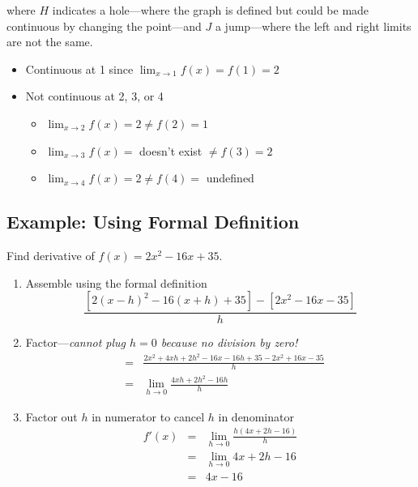 where $H$ indicates a hole---where the graph is defined but could be made continuous by changing the point---and $J$ a jump---where the left and right limits are not the same.

\begin{itemize}
    \item Continuous at 1 since $\lim_{x \rightarrow 1} f(x) = f(1) = 2$
    \item Not continuous at 2, 3, or 4
        \begin{itemize}
            \item $\lim_{x \rightarrow 2} f(x) =2 \neq f(2) = 1$
            \item $\lim_{x \rightarrow 3} f(x) =$ doesn't exist $\neq f(3) = 2$
            \item $\lim_{x \rightarrow 4} f(x) = 2 \neq f(4) =$ undefined
        \end{itemize}

\end{itemize}
\hformbar




\subsection*{Example: Using Formal Definition}

Find derivative of $f(x) = 2x^2 - 16x + 35$.

\begin{enumerate}
    \item Assemble using the formal definition
        \begin{equation}
            \frac{\left[ 2(x - h)^2 - 16(x + h) + 35 \right] - 
                \left[ 2x^2 - 16x - 35 \right] }{h}
        \end{equation}
        
    \item Factor---\textit{cannot plug $h=0$ because no division by zero!}
        \begin{eqnarray}
            &=& \frac{2x^2 + 4xh + 2h^2 - 16x - 16h + 35 - 2x^2 + 16x - 35}{h} \\
            &=& \lim_{h \rightarrow 0} \frac{4xh + 2h^2 - 16h}{h}
        \end{eqnarray}
        
    \item Factor out $h$ in numerator to cancel $h$ in denominator
        \begin{eqnarray}
            f'(x) &=& \lim_{h \rightarrow 0} \frac{h(4x + 2h - 16)}{h} \\
            &=& \lim_{h \rightarrow 0} 4x + 2h - 16 \\
            &=& 4x - 16
        \end{eqnarray}

\end{enumerate}
\hformbar



